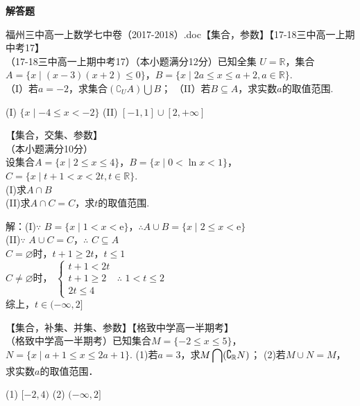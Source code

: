   \begin{exercise}{\bf 解答题}
    \item 福州三中高一上数学七中卷（2017-2018）.doc【集合，参数】【17-18三中高一上期中考17】\\
      （17-18三中高一上期中考17）（本小题满分12分）已知全集 $U=\mathbb{R}$，集合$A=\{x\mid (x-3)(x+2)\leq0\} $，$B=\{x\mid 2a\leq x\leq a+2,a\in \mathbb{R} \} $.\\
      （I）若$a=-2 $，求集合$(\complement_UA)\bigcup B $；
      （II）若$B\subseteq A $，求实数$a $的取值范围.
      \begin{answer}
       (I) $\{x\mid -4\leq x<-2 \} $
       (II) $[-1,1]\cup[2,+\infty] $
      \end{answer}
    \item 【集合，交集、参数】\\
      （本小题满分10分）\\
      设集合$A=\{x\mid 2\leq x\leq4\}$，$B=\{x\mid 0<\ln x<1\}$，$C=\{x\mid t+1<x<2t,t\in\mathbb{R}\}$.\\
      (I)求$A\cap B$\\
      (II)求$A\cap C=C$，求$t$的取值范围.\\
      \begin{answer}
      解：(I)$\because$ $B=\{x\mid 1<x<\mathrm{e}\}$，$\therefore$$A\cup B=\{x\mid 2\leq x<\mathrm{e}\}$\\
      (II)$\because$ $A\cup C=C$，$\therefore$ $C\subseteq A$\\
      $C=\varnothing$时，$t+1\geq 2t$，$t\leq 1$\\
      $C\neq\varnothing$时，
      $\begin{cases}
        t+1<2t\\
        t+1\geq 2\\
        2t\leq 4
      \end{cases}
      $
      $\therefore$ $1<t\leq 2$\\
      综上，$t\in (-\infty,2]$
      \end{answer}
    \item 【集合，补集、并集、参数】【格致中学高一半期考】\\
      （格致中学高一半期考）已知集合$M=\{-2\leq x\leq 5\} $，$N=\{x\mid a+1\leq x\leq 2a+1\} $.
      (1)若$a=3 $，求$M\displaystyle \bigcap(\complement_{\mathbb{R} }{\large N}) $；
      (2)若$M\cup N=M $，求实数$a $的取值范围．
      \begin{answer}
        (1) $[-2,4)$
        (2) $(-\infty,2] $
      \end{answer}
  \end{exercise}
